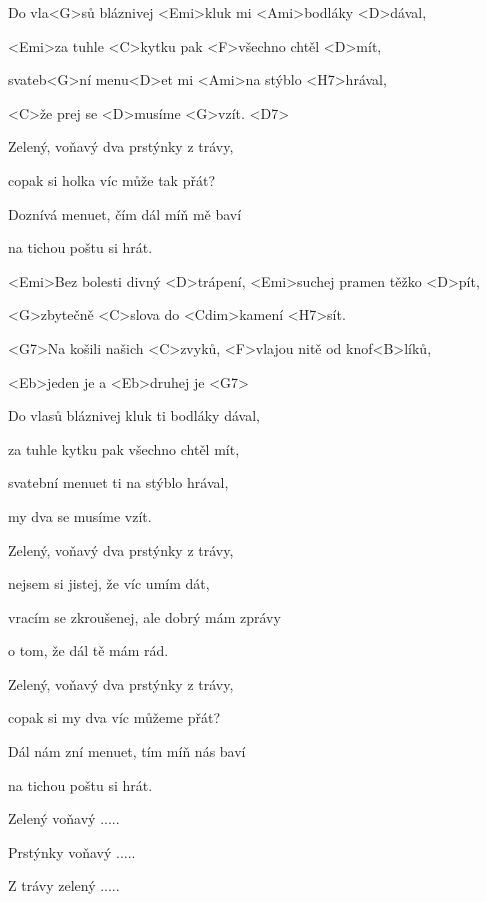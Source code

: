 

\zs
Do vla<G>sů bláznivej <Emi>kluk mi <Ami>bodláky <D>dával, 

<Emi>za tuhle <C>kytku pak <F>všechno chtěl <D>mít,

svateb<G>ní menu<D>et mi <Ami>na stýblo <H7>hrával, 

<C>že prej se <D>musíme <G>vzít. <D7>
\ks

\zs
Zelený, voňavý dva prstýnky z trávy,

copak si holka víc může tak přát?

Doznívá menuet, čím dál míň mě baví

na tichou poštu si hrát.
\ks

\zr
<Emi>Bez bolesti divný <D>trápení, <Emi>suchej pramen těžko <D>pít,

<G>zbytečně <C>slova do <Cdim>kamení <H7>sít.

<G7>Na košili našich <C>zvyků, <F>vlajou nitě od 
knof<B>líků,

<Eb>jeden je  a <Eb>druhej je  <G7>
\kr

\zs
Do vlasů bláznivej kluk ti bodláky dával,

za tuhle kytku pak všechno chtěl mít,

svatební menuet ti na stýblo hrával,

my dva se musíme vzít.
\ks

\zs
Zelený, voňavý dva prstýnky z trávy,

nejsem si jistej, že víc umím dát,

vracím se zkroušenej, ale dobrý mám zprávy

o tom, že dál tě mám rád.
\ks

\zs
Zelený, voňavý dva prstýnky z trávy,

copak si my dva víc můžeme přát?

Dál nám zní menuet, tím míň nás baví

na tichou poštu si hrát.



Zelený voňavý .....

Prstýnky voňavý .....

Z trávy zelený ..... 
\ks
\kp
